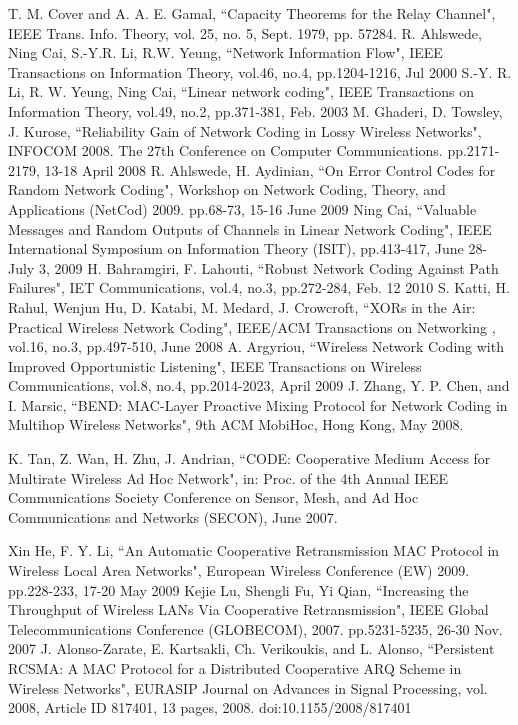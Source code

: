 \documentclass[conference]{IEEEtran}
\begin{document}
\begin{thebibliography}{1}

T. M. Cover and A. A. E. Gamal, ``Capacity Theorems for the Relay Channel", IEEE Trans. Info. Theory, vol. 25, no. 5, Sept. 1979, pp. 57284.
R. Ahlswede, Ning Cai, S.-Y.R. Li, R.W. Yeung, ``Network Information Flow",  IEEE Transactions on Information Theory, vol.46, no.4, pp.1204-1216, Jul 2000
S.-Y. R. Li, R. W. Yeung, Ning Cai, ``Linear network coding", IEEE Transactions on Information Theory, vol.49, no.2, pp.371-381, Feb. 2003
M. Ghaderi, D. Towsley, J. Kurose, ``Reliability Gain of Network Coding in Lossy Wireless Networks", INFOCOM 2008. The 27th Conference on Computer Communications. pp.2171-2179, 13-18 April 2008
R. Ahlswede, H. Aydinian, ``On Error Control Codes for Random Network Coding", Workshop on Network Coding, Theory, and Applications (NetCod) 2009. pp.68-73, 15-16 June 2009
Ning Cai, ``Valuable Messages and Random Outputs of Channels in Linear Network Coding", IEEE International Symposium on Information Theory (ISIT), pp.413-417, June 28-July 3, 2009
H. Bahramgiri, F. Lahouti, ``Robust Network Coding Against Path Failures", IET Communications, vol.4, no.3, pp.272-284, Feb. 12 2010
S. Katti, H. Rahul, Wenjun Hu, D. Katabi, M. Medard, J. Crowcroft, ``XORs in the Air: Practical Wireless Network Coding", IEEE/ACM Transactions on Networking , vol.16, no.3, pp.497-510, June 2008
A. Argyriou, ``Wireless Network Coding with Improved Opportunistic Listening", IEEE Transactions on Wireless Communications, vol.8, no.4, pp.2014-2023, April 2009
J. Zhang, Y. P. Chen, and I. Marsic, ``BEND: MAC-Layer Proactive Mixing Protocol for Network Coding in Multihop Wireless Networks", 9th ACM MobiHoc, Hong Kong, May 2008.

K. Tan, Z. Wan, H. Zhu, J. Andrian, ``CODE: Cooperative Medium Access for Multirate Wireless Ad Hoc Network", in: Proc. of the 4th Annual IEEE Communications Society Conference on Sensor, Mesh, and Ad Hoc Communications and Networks (SECON), June 2007.

Xin He, F. Y. Li, ``An Automatic Cooperative Retransmission MAC Protocol in Wireless Local Area Networks", European Wireless Conference (EW) 2009. pp.228-233, 17-20 May 2009
Kejie Lu, Shengli Fu, Yi Qian, ``Increasing the Throughput of Wireless LANs Via Cooperative Retransmission", IEEE Global Telecommunications Conference (GLOBECOM), 2007. pp.5231-5235, 26-30 Nov. 2007
J. Alonso-Zarate, E. Kartsakli, Ch. Verikoukis, and L. Alonso, ``Persistent RCSMA: A MAC Protocol for a Distributed Cooperative ARQ Scheme in Wireless Networks", EURASIP Journal on Advances in Signal Processing, vol. 2008, Article ID 817401, 13 pages, 2008. doi:10.1155/2008/817401


\end{thebibliography}
\end{document}
